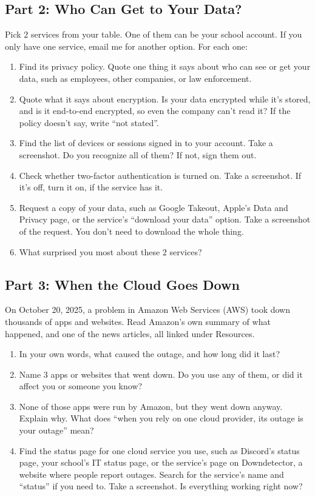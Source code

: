 \documentclass[12pt]{article}
\begin{document}
\subsection*{Part 2: Who Can Get to Your Data?}
Pick 2 services from your table. One of them can be your school account. If you only have one service, email me for another option. For each one:
\begin{enumerate}[start=3]
    \item Find its privacy policy. Quote one thing it says about who can see or get your data, such as employees, other companies, or law enforcement.
    \item Quote what it says about encryption. Is your data encrypted while it's stored, and is it end-to-end encrypted, so even the company can't read it? If the policy doesn't say, write ``not stated''.
    \item Find the list of devices or sessions signed in to your account. Take a screenshot. Do you recognize all of them? If not, sign them out.
    \item Check whether two-factor authentication is turned on. Take a screenshot. If it's off, turn it on, if the service has it.
    \item Request a copy of your data, such as Google Takeout, Apple's Data and Privacy page, or the service's ``download your data'' option. Take a screenshot of the request. You don't need to download the whole thing.
    \item What surprised you most about these 2 services?
\end{enumerate}

\subsection*{Part 3: When the Cloud Goes Down}
On October 20, 2025, a problem in Amazon Web Services (AWS) took down thousands of apps and websites. Read Amazon's own summary of what happened, and one of the news articles, all linked under Resources.
\begin{enumerate}[start=9]
    \item In your own words, what caused the outage, and how long did it last?
    \item Name 3 apps or websites that went down. Do you use any of them, or did it affect you or someone you know?
    \item None of those apps were run by Amazon, but they went down anyway. Explain why. What does ``when you rely on one cloud provider, its outage is your outage'' mean?
    \item Find the status page for one cloud service you use, such as Discord's status page, your school's IT status page, or the service's page on Downdetector, a website where people report outages. Search for the service's name and ``status'' if you need to. Take a screenshot. Is everything working right now?
\end{enumerate}
\end{document}
